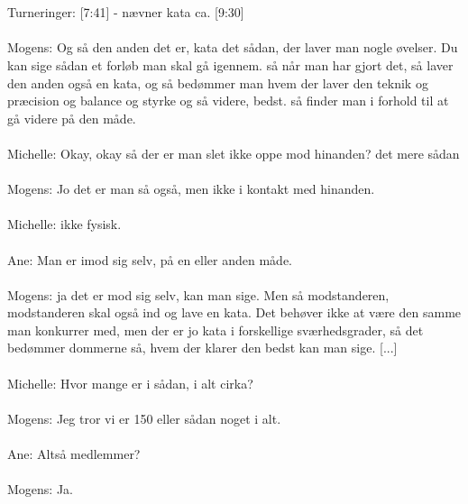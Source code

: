 \\\\
Turneringer:
[7:41] - 
nævner kata ca. [9:30]
\\\\
[9:59]
Mogens: Og så den anden det er, kata det sådan, der laver man nogle øvelser. Du kan sige sådan et forløb man skal gå igennem. så når man har gjort det, så laver den anden også en kata, og så bedømmer man hvem der laver den teknik og præcision og balance og styrke og så videre, bedst. så finder man i forhold til at gå videre på den måde.
\\\\
Michelle: Okay, okay så der er man slet ikke oppe mod hinanden? det mere sådan
\\\\
[10:29]
Mogens: Jo det er man så også, men ikke i kontakt med hinanden.
\\\\
Michelle: ikke fysisk.
\\\\
Ane: Man er imod sig selv, på en eller anden måde.
\\\\
[10:34]
Mogens: ja det er mod sig selv, kan man sige. Men så modstanderen, modstanderen skal også ind og lave en kata. Det behøver ikke at være den samme man konkurrer med, men der er jo kata i forskellige sværhedsgrader, så det bedømmer dommerne så, hvem der klarer den bedst kan man sige. [...]
\\\\
[19:42]
Michelle: Hvor mange er i sådan, i alt cirka?
\\\\
Mogens: Jeg tror vi er 150 eller sådan noget i alt. 
\\\\
Ane: Altså medlemmer?
\\\\
Mogens: Ja. 